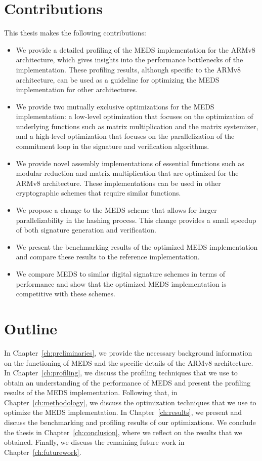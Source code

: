 \documentclass[11pt,a4paper]{report}
\theoremstyle{definition}
\begin{document}
\section{Contributions}
This thesis makes the following contributions:
\begin{itemize}
  \item We provide a detailed profiling of the MEDS implementation for the ARMv8 architecture, which gives insights into the performance bottlenecks of the implementation. These profiling results, although specific to the ARMv8 architecture, can be used as a guideline for optimizing the MEDS implementation for other architectures.
  \item We provide two mutually exclusive optimizations for the MEDS implementation: a low-level optimization that focuses on the optimization of underlying functions such as matrix multiplication and the matrix systemizer, and a high-level optimization that focuses on the parallelization of the commitment loop in the signature and verification algorithms.
  \item We provide novel assembly implementations of essential functions such as modular reduction and matrix multiplication that are optimized for the ARMv8 architecture. These implementations can be used in other cryptographic schemes that require similar functions.
  \item We propose a change to the MEDS scheme that allows for larger parallelizability in the hashing process. This change provides a small speedup of both signature generation and verification.
  \item We present the benchmarking results of the optimized MEDS implementation and compare these results to the reference implementation.
  \item We compare MEDS to similar digital signature schemes in terms of performance and show that the optimized MEDS implementation is competitive with these schemes.
\end{itemize}

\section{Outline}
In Chapter~\ref{ch:preliminaries}, we provide the necessary background information on the functioning of MEDS and the specific details of the ARMv8 architecture. In Chapter~\ref{ch:profiling}, we discuss the profiling techniques that we use to obtain an understanding of the performance of MEDS and present the profiling results of the MEDS implementation. Following that, in Chapter~\ref{ch:methodology}, we discuss the optimization techniques that we use to optimize the MEDS implementation. In Chapter~\ref{ch:results}, we present and discuss the benchmarking and profiling results of our optimizations. We conclude the thesis in Chapter~\ref{ch:conclusion}, where we reflect on the results that we obtained. Finally, we discuss the remaining future work in Chapter~\ref{ch:futurework}.
\end{document}
